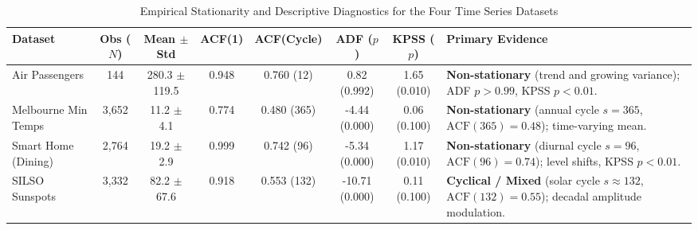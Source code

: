 \begin{table}[t]
\centering
\footnotesize
\caption{Empirical Stationarity and Descriptive Diagnostics for the Four Time Series Datasets}
\label{tab:stationarity}
\begin{tabular*}{\textwidth}{@{\extracolsep{\fill}}lccccccp{4.2cm}}
\toprule
\textbf{Dataset} & \textbf{Obs ($N$)} & \textbf{Mean $\pm$ Std} & \textbf{ACF(1)} & \textbf{ACF(Cycle)} & \textbf{ADF ($p$)} & \textbf{KPSS ($p$)} & \textbf{Primary Evidence} \\
\midrule
Air Passengers & 144 & 280.3 $\pm$ 119.5 & 0.948 & 0.760 (12) & 0.82 (0.992) & 1.65 (0.010) & \textbf{Non-stationary} (trend and growing variance); ADF $p>0.99$, KPSS $p<0.01$. \\
Melbourne Min Temps & 3,652 & 11.2 $\pm$ 4.1 & 0.774 & 0.480 (365) & -4.44 (0.000) & 0.06 (0.100) & \textbf{Non-stationary} (annual cycle $s=365$, $\text{ACF}(365)=0.48$); time-varying mean. \\
Smart Home (Dining) & 2,764 & 19.2 $\pm$ 2.9 & 0.999 & 0.742 (96) & -5.34 (0.000) & 1.17 (0.010) & \textbf{Non-stationary} (diurnal cycle $s=96$, $\text{ACF}(96)=0.74$); level shifts, KPSS $p<0.01$. \\
SILSO Sunspots & 3,332 & 82.2 $\pm$ 67.6 & 0.918 & 0.553 (132) & -10.71 (0.000) & 0.11 (0.100) & \textbf{Cyclical / Mixed} (solar cycle $s\approx 132$, $\text{ACF}(132)=0.55$); decadal amplitude modulation. \\
\bottomrule
\end{tabular*}
\end{table}
